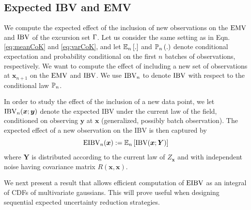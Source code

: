 \documentclass[aoas]{imsart}
\begin{document}
\subsection{Expected IBV and EMV}
\label{sec:eibv}
We compute the expected effect of the inclusion of new observations on the $\mathrm{EMV}$ and $\mathrm{IBV}$ of the excursion set $\Gamma$. Let us consider the same setting as in Eqn. \eqref{eq:meanCoK} and \eqref{eq:varCoK}, and let 
$\mathbb{E}_{n} \left[.\right]$ and $\mathbb{P}_{n} \left(.\right)$ denote conditional expectation
and probability conditional on the first $n$ batches of observations, respectively. We want to compute the effect of including a new set of observations at $\bm{x}_{n+1}$ on the $\mathrm{EMV}$ and $\mathrm{IBV}$. We use $\operatorname{IBV}_{n}$ to denote $\operatorname{IBV}$ with respect to the conditional law $\mathbb{P}_{n}$.

\medskip

In order to study the effect of the inclusion of a new data point, we let
$
\operatorname{IBV}_{n}(\bm{x}; \bm{y})
$
denote the expected IBV under the current law of the field, conditioned on observing $\bm{y}$ at $\bm{x}$ (generalized, possibly batch observation). The expected effect of a new observation on the IBV is then captured by
\begin{equation}\label{def:eibv}
    \currentEIBV(\bm{x}):=\mathbb{E}_{\stage}\left[\mbox{IBV}(\bm{x}; \bm{Y})\right]
\end{equation}
where $\bm{Y}$ is distributed according to the current law of $Z_{\bm{x}}$ and with independent noise having covariance matrix $R(\bm{x},\bm{x})$.

We next present a result that allows efficient computation of $\operatorname{EIBV}$ as an integral of CDFs of multivariate gaussians. This will prove useful when designing sequential expected uncertainty reduction strategies.
\end{document}
